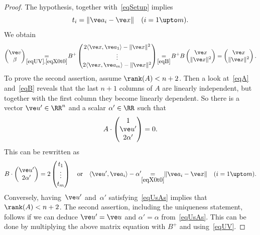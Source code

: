 \documentclass[reqno]{amsart}
\begin{document}
\begin{proof}
  The hypothesis, together with~\eqref{eqSetup} implies
  \begin{equation} \label{eqX0t0}%
    t_i = \lVert\ve a_i - \ve x\rVert \quad (i = 1 \upto m).
  \end{equation}
  We obtain
  \[
    \begin{pmatrix}
      \ve v \\ \beta
    \end{pmatrix} \!\underset{\eqref{eqUV},\eqref{eqX0t0}}{=}\!
    B^+
    \begin{pmatrix}
      2 \langle\ve x,\ve a_1\rangle - \lVert\ve x\rVert^2 \\
      \vdots \\
      2 \langle\ve x,\ve a_m\rangle - \lVert\ve x\rVert^2
    \end{pmatrix} \!\underset{\eqref{eqB}}{=}\! B^+
    B
    \begin{pmatrix}
      \ve x \\ \lVert\ve x\rVert^2
    \end{pmatrix} =
    \begin{pmatrix}
      \ve x \\ \lVert\ve x\rVert^2
    \end{pmatrix}.
  \]
  To prove the second assertion, assume $\rank(A) < n+2$. Then a look
  at~\eqref{eqA} and~\eqref{eqB} reveals that the last $n+1$
  columns of $A$ are linearly independent, but together with the first
  column they become linearly dependent. So there is a vector
  $\ve u' \in \RR^n$ and a scalar $\alpha' \in \RR$ such that
  \[
    A \cdot
    \begin{pmatrix}
      1 \\ \ve u' \\ 2 \alpha'
    \end{pmatrix}
    = 0.
  \]
  This can be rewritten as
  \begin{equation} \label{eqUsAs}%
    B \cdot
    \begin{pmatrix}
      \ve u' \\ 2 \alpha'
    \end{pmatrix}
    = 2
    \begin{pmatrix}
      t_1 \\ \vdots \\ t_m
    \end{pmatrix}
    \quad \text{or} \quad \langle\ve u',\ve a_i\rangle - \alpha'
    \!\!\underset{\eqref{eqX0t0}}{=}\!\!  \lVert\ve a_i - \ve x\rVert
    \quad (i = 1 \upto m).
  \end{equation}
  Conversely, having~$\ve u'$ and~$\alpha'$ satisfying~\eqref{eqUsAs}
  implies that $\rank(A) < n+2$. The second assertion, including the
  uniqueness statement, follows if we can deduce $\ve u' = \ve u$ and
  $\alpha' = \alpha$ from~\eqref{eqUsAs}. This can be done by
  multiplying the above matrix equation with $B^+$ and
  using~\eqref{eqUV}.
\end{proof}
\end{document}

